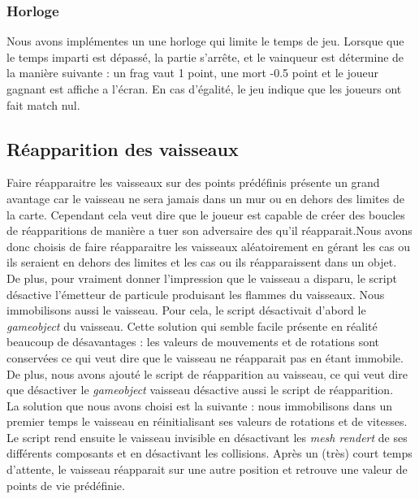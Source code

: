 \documentclass[10pt, titlepage]{report}
\begin{document}
\subsubsection{Horloge}
Nous avons implémentes un une horloge qui limite le temps de jeu. Lorsque que le temps imparti est dépassé, la partie s'arrête, et le vainqueur est détermine de la manière suivante : un frag vaut 1 point, une mort -0.5 point et le joueur gagnant est affiche a l'écran. En cas d'égalité, le jeu indique que les joueurs ont fait match nul.\\

\subsection{Réapparition des vaisseaux}  
Faire réapparaitre les vaisseaux sur des points prédéfinis présente un grand avantage car le vaisseau ne sera jamais dans un mur ou en dehors des limites de la carte. Cependant cela veut dire que le joueur est capable de créer des boucles de réapparitions de manière a tuer son adversaire des qu'il réapparait.Nous avons donc choisis de faire réapparaitre les vaisseaux aléatoirement en gérant les cas ou ils seraient en dehors des limites et les cas ou ils réapparaissent dans un objet.\\

De plus, pour vraiment donner l'impression que le vaisseau a disparu, le script désactive l'émetteur de particule produisant les flammes du vaisseaux. Nous immobilisons aussi le vaisseau. Pour cela, le script désactivait d'abord le \textit{gameobject} du vaisseau. Cette solution qui semble facile présente en réalité beaucoup de désavantages : les valeurs de mouvements et de rotations sont conservées ce qui veut dire que le vaisseau ne réapparait pas en étant immobile. De plus, nous avons ajouté le script de réapparition au vaisseau, ce qui veut dire que désactiver le \textit{gameobject} vaisseau désactive aussi le script de réapparition.\\

 La solution que nous avons choisi est la suivante : nous immobilisons dans un premier temps le vaisseau en réinitialisant ses valeurs de rotations et de vitesses. Le script  rend ensuite le vaisseau invisible en désactivant les \textit{mesh rendert} de ses différents composants et en désactivant les collisions. Après un (très) court temps d'attente, le vaisseau réapparait sur une autre position et retrouve une valeur de points de vie prédéfinie.\\
\end{document}
